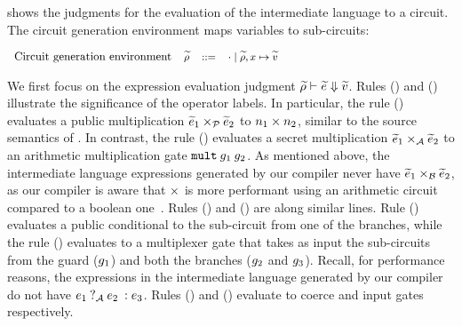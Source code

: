  shows the judgments for the evaluation of
the intermediate language to a circuit. The circuit generation environment maps
variables to sub-circuits:

\vspace{0.2cm}
$
\footnotesize
\begin{array}{rrcl}
    \ftext{Circuit generation environment} & \widetilde\rho &::=& \cdot \mid \widetilde\rho,x \mapsto \val\\
\end{array}
$
\vspace{0.2cm}

We first focus on the expression evaluation judgment
$\widetilde{\rho} \vdash \widetilde{e} \Downarrow\val$. 
%
Rules ({}) and ({}) illustrate
the significance of the operator labels. In particular, the rule
({}) evaluates a public multiplication $\widetilde{e}_{1}
\mulop_{\mathcal{P}} \widetilde{e}_{2}$ to $n_{1} \mulop n_{2}$, similar to the
source semantics of . In contrast, the rule
({}) evaluates a secret multiplication $\widetilde{e}_{1}
\mulop_{\mathcal{A}} \widetilde{e}_{2}$ to an arithmetic multiplication
gate $\kw{mult}\:\gate_{1}\:\gate_{2}$. As mentioned above, the intermediate language
expressions generated by our compiler never have $\widetilde{e}_{1}
\mulop_{\mathcal{B}} \widetilde{e}_{2}$, as our compiler is aware that $\mulop$
is more performant using an arithmetic circuit compared to a boolean
one~\cite{aby}. Rules ({}) and ({})
are along similar lines. Rule ({}) evaluates a public
conditional to the sub-circuit  from one of the branches, while the rule
({}) evaluates to a multiplexer  gate that takes as  input
the sub-circuits from the guard ($\gate_{1}$) and both the branches
($\gate_{2}$ and $\gate_{3}$). Recall, for performance reasons,
the  expressions in the intermediate language generated by our compiler do not have
$\lcond{\mathcal{A}}{e_{1}}{e_{2}}{e_{3}}$. Rules
({}) and ({}) evaluate to coerce and input
gates respectively.

